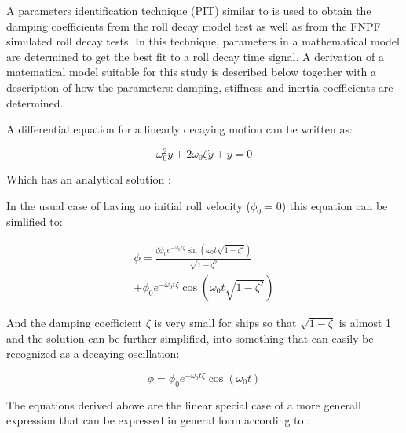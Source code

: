     A parameters identification technique (PIT) similar to
\cite{7505983/EXYJELCU} is used to obtain the damping coefficients from
the roll decay model test as well as from the FNPF simulated roll decay
tests. In this technique, parameters in a mathematical model are
determined to get the best fit to a roll decay time signal. A derivation
of a matematical model suitable for this study is described below
together with a description of how the parameters: damping, stiffness
and inertia coefficients are determined.

A differential equation for a linearly decaying motion can be written
as:
 
            
    
    \begin{equation}
\omega_{0}^{2} y + 2 \omega_{0} \zeta \dot{y} + \ddot{y} = 0
\label{eq:equation}
\end{equation}

    

    Which has an analytical solution \cite{undefined}:

    In the usual case of having no initial roll velocity (\(\phi_0=0\)) this
equation can be simlified to:
 
            
    
    \begin{equation}
\begin{aligned}
\phi = \frac{\zeta \phi_{0} e^{- \omega_{0} t \zeta} \operatorname{sin}\left(\omega_{0} t \sqrt{1 - \zeta^{2}}\right)}{\sqrt{1 - \zeta^{2}}} \\ + \phi_{0} e^{- \omega_{0} t \zeta} \operatorname{cos}\left(\omega_{0} t \sqrt{1 - \zeta^{2}}\right)
\end{aligned}
\label{eq:equation}
\end{equation}

    

    And the damping coefficient \(\zeta\) is very small for ships so that
\(\sqrt{1-\zeta}\) is almost 1 and the solution can be further
simplified, into something that can easily be recognized as a decaying
oscillation:
 
            
    
    \begin{equation}
\phi = \phi_{0} e^{- \omega_{0} t \zeta} \operatorname{cos}\left(\omega_{0} t\right)
\label{eq:equation}
\end{equation}

    

    The equations derived above are the linear special case of a more
generall expression that can be expressed in general form according to
\cite{7505983/FB64RGPF}:
 
